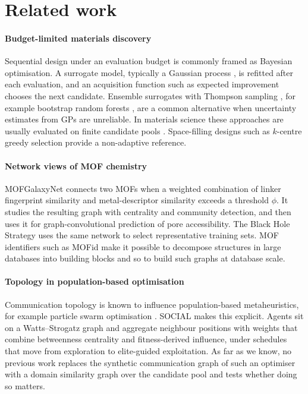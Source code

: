 \section{Related work}
\label{sec:related}

\paragraph{Budget-limited materials discovery}
Sequential design under an evaluation budget is commonly framed as Bayesian optimisation. A surrogate model, typically a Gaussian process \citep{rasmussen2006gp}, is refitted after each evaluation, and an acquisition function such as expected improvement \citep{jones1998ego} chooses the next candidate. Ensemble surrogates with Thompson sampling \citep{thompson1933}, for example bootstrap random forests \citep{breiman2001rf}, are a common alternative when uncertainty estimates from GPs are unreliable. In materials science these approaches are usually evaluated on finite candidate pools \citep{lookman2019active}. Space-filling designs such as $k$-centre greedy selection \citep{sener2018coreset} provide a non-adaptive reference.

\paragraph{Network views of MOF chemistry}
MOFGalaxyNet \citep{jalali2023mofgalaxynet} connects two MOFs when a weighted combination of linker fingerprint similarity and metal-descriptor similarity exceeds a threshold $\phi$. It studies the resulting graph with centrality and community detection, and then uses it for graph-convolutional prediction of pore accessibility. The Black Hole Strategy \citep{jalali2025blackhole} uses the same network to select representative training sets. MOF identifiers such as MOFid \citep{bucior2019mofid} make it possible to decompose structures in large databases into building blocks and so to build such graphs at database scale.

\paragraph{Topology in population-based optimisation}
Communication topology is known to influence population-based metaheuristics, for example particle swarm optimisation \citep{kennedy1995pso,clerc2002pso}. SOCIAL \citep{jalali2026social} makes this explicit. Agents sit on a Watts--Strogatz graph \citep{watts1998small} and aggregate neighbour positions with weights that combine betweenness centrality \citep{brandes2001faster} and fitness-derived influence, under schedules that move from exploration to elite-guided exploitation. As far as we know, no previous work replaces the synthetic communication graph of such an optimiser with a domain similarity graph over the candidate pool and tests whether doing so matters.
